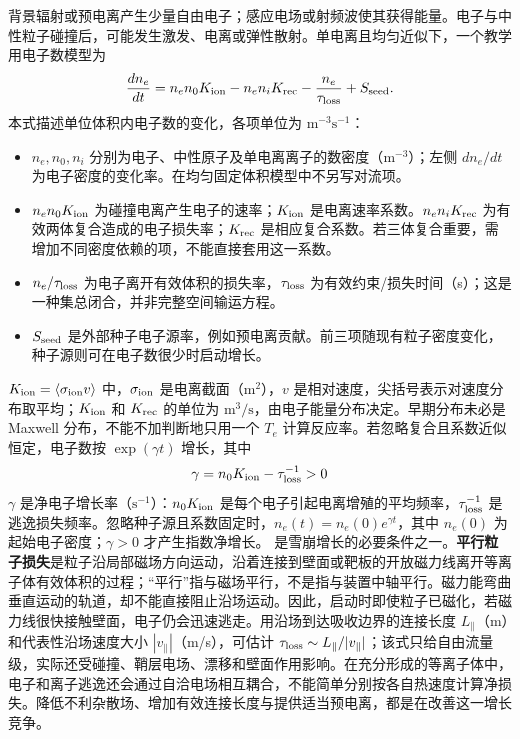 \documentclass[12pt,fontset=none]{ctexart}
\numberwithin{equation}{section}
\numberwithin{table}{section}
\numberwithin{figure}{section}
\begin{document}
背景辐射或预电离产生少量自由电子；感应电场或射频波使其获得能量。电子与中性粒子碰撞后，可能发生激发、电离或弹性散射。单电离且均匀近似下，一个教学用电子数模型为
\begin{equation}\label{eq:cycle-avalanche}
 \frac{dn_e}{dt}=n_en_0K_{\rm ion}-n_en_iK_{\rm rec}
 -\frac{n_e}{\tau_{\rm loss}}+S_{\rm seed}.
\end{equation}
本式描述单位体积内电子数的变化，各项单位为 $\mathrm{m^{-3}s^{-1}}$：
\begin{itemize}[nosep]
 \item $n_e,n_0,n_i$ 分别为电子、中性原子及单电离离子的数密度（$\mathrm{m^{-3}}$）；左侧 $dn_e/dt$ 为电子密度的变化率。在均匀固定体积模型中不另写对流项。
 \item $n_en_0K_{\rm ion}$ 为碰撞电离产生电子的速率；$K_{\rm ion}$ 是电离速率系数。$n_en_iK_{\rm rec}$ 为有效两体复合造成的电子损失率；$K_{\rm rec}$ 是相应复合系数。若三体复合重要，需增加不同密度依赖的项，不能直接套用这一系数。
 \item $n_e/\tau_{\rm loss}$ 为电子离开有效体积的损失率，$\tau_{\rm loss}$ 为有效约束/损失时间（s）；这是一种集总闭合，并非完整空间输运方程。
 \item $S_{\rm seed}$ 是外部种子电子源率，例如预电离贡献。前三项随现有粒子密度变化，种子源则可在电子数很少时启动增长。
\end{itemize}
$K_{\rm ion}=\langle\sigma_{\rm ion}v\rangle$ 中，$\sigma_{\rm ion}$ 是电离截面（$\mathrm{m^2}$），$v$ 是相对速度，尖括号表示对速度分布取平均；$K_{\rm ion}$ 和 $K_{\rm rec}$ 的单位为 $\mathrm{m^3/s}$，由电子能量分布决定。早期分布未必是 Maxwell 分布，不能不加判断地只用一个 $T_e$ 计算反应率。若忽略复合且系数近似恒定，电子数按 $\exp(\gamma t)$ 增长，其中
\begin{equation}\label{eq:cycle-growth}
 \gamma=n_0K_{\rm ion}-\tau_{\rm loss}^{-1}>0
\end{equation}
$\gamma$ 是净电子增长率（$\mathrm{s^{-1}}$）：$n_0K_{\rm ion}$ 是每个电子引起电离增殖的平均频率，$\tau_{\rm loss}^{-1}$ 是逃逸损失频率。忽略种子源且系数固定时，$n_e(t)=n_e(0)e^{\gamma t}$，其中 $n_e(0)$ 为起始电子密度；$\gamma>0$ 才产生指数净增长。
是雪崩增长的必要条件之一。\textbf{平行粒子损失}是粒子沿局部磁场方向运动，沿着连接到壁面或靶板的开放磁力线离开等离子体有效体积的过程；``平行''指与磁场平行，不是指与装置中轴平行。磁力能弯曲垂直运动的轨道，却不能直接阻止沿场运动。因此，启动时即使粒子已磁化，若磁力线很快接触壁面，电子仍会迅速逃走。用沿场到达吸收边界的连接长度 $L_\parallel$（m）和代表性沿场速度大小 $|v_\parallel|$（m/s），可估计 $\tau_{\rm loss}\sim L_\parallel/|v_\parallel|$；该式只给自由流量级，实际还受碰撞、鞘层电场、漂移和壁面作用影响。在充分形成的等离子体中，电子和离子逃逸还会通过自洽电场相互耦合，不能简单分别按各自热速度计算净损失。降低不利杂散场、增加有效连接长度与提供适当预电离，都是在改善这一增长竞争。
\end{document}
